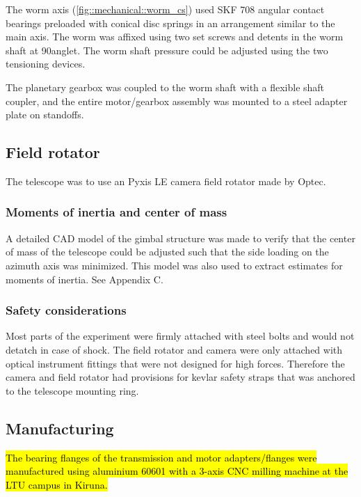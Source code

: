 The worm axis (\ref{fig::mechanical::worm_cs}) used SKF 708 angular contact bearings preloaded with conical disc springs in an arrangement similar to the main axis. The worm was affixed using two set screws and detents in the worm shaft at 90\degree anglet. The worm shaft pressure could be adjusted using the two tensioning devices. 

The planetary gearbox was coupled to the worm shaft with a flexible shaft coupler, and the entire motor/gearbox assembly was mounted to a steel adapter plate on standoffs. 

\subsection{Field rotator}

The telescope was to use an Pyxis LE camera field rotator made by Optec. 

\subsubsection{Moments of inertia and center of mass}

A detailed CAD model of the gimbal structure was made to verify that the center of mass of the telescope could be adjusted such that the side loading on the azimuth axis was minimized. This model was also used to extract estimates for moments of inertia. See Appendix C.

\subsubsection{Safety considerations}

Most parts of the experiment were firmly attached with steel bolts and would not detatch in case of shock. The field rotator and camera were only attached with optical instrument fittings that were not designed for high forces. Therefore the camera and field rotator had provisions for kevlar safety straps that was anchored to the telescope mounting ring. 

\subsection{Manufacturing}

\hl{The bearing flanges of the transmission and motor adapters/flanges were manufactured using aluminium 60601 with a 3-axis CNC milling machine at the LTU campus in Kiruna.}

